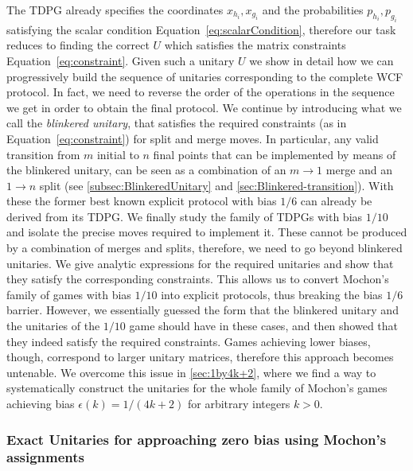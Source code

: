 \documentclass{article}
\begin{document}
The TDPG already specifies the coordinates $x_{h_{i}},x_{g_{i}}$
and the probabilities $p_{h_{i}},p_{g_{i}}$ satisfying the scalar condition Equation~\eqref{eq:scalarCondition}, therefore our task reduces to finding the correct
$U$ which satisfies the matrix constraints Equation~\eqref{eq:constraint}.
Given such a unitary $U$ we show in detail how we can progressively build the sequence of unitaries corresponding to the complete WCF protocol. In fact, we need to reverse the order of the operations in the sequence we get in order to obtain the final protocol.
%
%
%
%
%
%
We continue by introducing what we call the \emph{blinkered
  unitary}, that satisfies the required constraints (as in Equation~\eqref{eq:constraint}) for split and
merge moves. In particular, any
valid transition from $m$ initial to $n$ final points that can be implemented by means of the blinkered unitary, can be seen as a combination of an $m\rightarrow 1$ merge and an $1\rightarrow n$ split (see \cref{subsec:BlinkeredUnitary} and \cref{sec:Blinkered-transition}).
With these the former best known explicit protocol with bias $1/6$ \cite{Mochon05} can already be derived
from its TDPG.  We finally study
the family of TDPGs with bias $1/10$ and isolate the precise moves required
to implement it. These cannot be produced by a combination of merges and splits, therefore, we need to go beyond blinkered unitaries. We give analytic expressions for the required
unitaries and show that they satisfy the corresponding constraints.
This allows us to convert Mochon's family of games with bias $1/10$
into explicit protocols, thus breaking the bias $1/6$ barrier.
However, we essentially guessed the form that the blinkered unitary and the unitaries of the $1/10$ game should have in these cases, and then showed that
they
indeed satisfy the required constraints.
Games achieving
lower biases, though, correspond to larger unitary matrices, therefore
this approach becomes untenable. We overcome this issue in  \cref{sec:1by4k+2}, where we find a way to systematically construct the unitaries for the whole family of Mochon's games achieving bias $\epsilon(k)=1/(4k+2)$ for arbitrary integers $k>0$.

\subsubsection{Exact Unitaries for approaching zero bias using Mochon's assignments\label{subsec:contralgebraic}}
\end{document}
